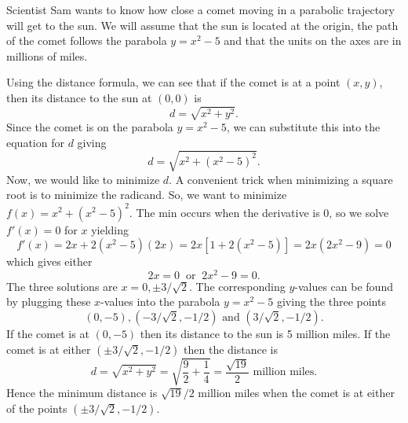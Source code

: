 \documentclass{ximera}
\begin{document}
\begin{example}[example3]
Scientist Sam wants to know how close a comet moving in a parabolic trajectory will get to the sun. 
We will assume that the sun is located at the origin, 
the path of the comet follows the parabola $y = x^2 - 5$ and that the units 
on the axes are in millions of miles.

\begin{center}
\end{center}

Using the distance formula, we can see that if the comet is at a point $(x, y)$, 
then its distance to the sun at $(0, 0)$ is
\[d = \sqrt{x^2 + y^2}.\]
Since the comet is on the parabola $y = x^2 - 5$, we can substitute this into the equation for $d$ giving
\[d = \sqrt{x^2 + (x^2 - 5)^2}.\]
Now, we would like to minimize $d$. A convenient trick when minimizing a square root is to minimize the radicand.
So, we want to minimize $f(x) = x^2 + (x^2 - 5)^2$. The min occurs when the derivative is 0, so we solve
$f'(x) = 0$ for $x$ yielding
\[f'(x) = 2x + 2(x^2 - 5)(2x) = 2x[1+ 2(x^2 - 5)] = 2x(2x^2 - 9) = 0\]
which gives either 
\[2x = 0 \;\; \text{or} \;\; 2x^2 - 9 = 0.\]
The three solutions are $x = 0, \pm 3/\sqrt2$.
The corresponding $y$-values can be found by plugging these $x$-values into the parabola $y = x^2 - 5$
giving the three points
\[(0, -5), (-3/\sqrt2, -1/2) \mbox{ and } (3/\sqrt2, -1/2).\]
If the comet is at $(0, -5)$ then its distance to the sun is 5 million miles.  If the comet is at 
either $(\pm 3/\sqrt2, -1/2)$ then the distance is 
\[d = \sqrt{x^2 + y^2} = \sqrt{{\frac{9}{2} + \frac14}} = \frac{\sqrt {19}}{2} \mbox{ million miles}.\]
Hence the minimum distance is $\sqrt{19}/2$ million miles when the comet is at either of the points 
$(\pm 3/ \sqrt 2, -1/2)$.
\end{example}
\end{document}
